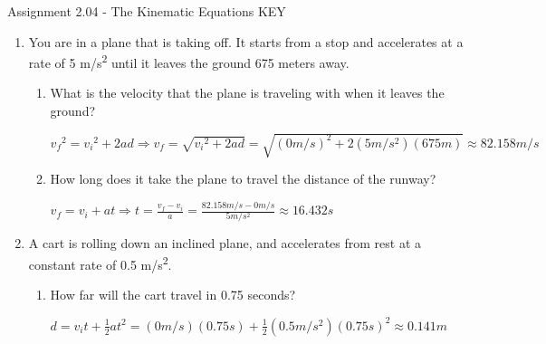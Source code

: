 \documentclass[letterpaper, 12pt]{article}
\begin{document}


\begin{center} Assignment 2.04 - The Kinematic Equations KEY
\end{center}

\begin{enumerate}
\item You are in a plane that is taking off.  It starts from a stop and accelerates at a rate of 5 m/s\textsuperscript{2} until it leaves the ground 675 meters away.  
	\begin{enumerate} 
		\item What is the velocity that the plane is traveling with when it leaves the ground? 
		\vspace{0.15in}
		\color{red}
		\begin{center} ${v_f}^2 = {v_i}^2 + 2 a d \Longrightarrow  v_f = \sqrt{{v_i}^2 + 2 a d} = \sqrt{(0 m/s)^2 + 2 (5m/s^2)(675m)} \approx 82.158 m/s  $
		\vspace{0.15in}
		\end{center}
		\color{black}
		
		\item How long does it take the plane to travel the distance of the runway?
			\vspace{0.15in}
			\color{red}
			\begin{center}
				 $v_f = v_i + a t \Longrightarrow t = \frac{v_f-v_i}{a} = \frac{82.158 m/s - 0 m/s}{5m/s^2} \approx 16.432 s$
				\vspace{0.15in}
			\end{center}
			\color{black}
		
	\end{enumerate}
	\item A cart is rolling down an inclined plane, and accelerates from rest at a constant rate of 0.5 m/s\textsuperscript{2}. 
	\begin{enumerate}
		\item How far will the cart travel in 0.75 seconds?
			\vspace{0.15in}
			\color{red}
			\begin{center}
				$d = v_i t + \frac{1}{2}at^2 = (0 m/s)(0.75s)+\frac{1}{2}(0.5 m/s^2)(0.75s)^2 \approx 0.141 m  $
				\vspace{0.15in}
			\end{center}
			\color{black}
		

\end{enumerate}
\end{enumerate}
\end{document}
